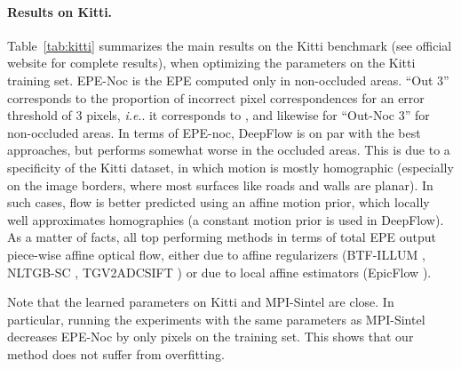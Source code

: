 \documentclass[twocolumn,natbib]{svjour3}
\makeatletter
\DeclareRobustCommand\onedot{\futurelet\@let@token\@onedot}
\def\@onedot{\ifx\@let@token.\else.\null\fi\xspace}
\def\ie{\emph{i.e}\onedot} \def\Ie{\emph{I.e}\onedot}
\makeatother
\begin{document}
\paragraph{Results on Kitti.}

Table~\ref{tab:kitti} summarizes the main results on the Kitti benchmark
(see official website for complete results), when optimizing the parameters
on the Kitti training set. EPE-Noc is the EPE computed only in
non-occluded areas. 
``Out 3'' corresponds to the proportion of incorrect pixel correspondences for an error
threshold of 3 pixels, \ie it corresponds to , and likewise for ``Out-Noc 3'' 
for non-occluded areas. 
In terms of EPE-noc, DeepFlow is on par with the best approaches, 
but performs somewhat worse in the occluded areas. This is 
due to a specificity of the Kitti dataset, in which motion is mostly homographic 
(especially on the image borders, where most surfaces like roads and walls are planar). 
In such cases, flow is better predicted using an affine motion prior, 
which locally well approximates homographies (a constant motion prior is used in DeepFlow).
As a matter of facts, all top performing methods in terms of total EPE output
piece-wise affine optical flow, either due to affine regularizers 
(BTF-ILLUM \citep{demetz2014learning}, NLTGB-SC \citep{ranftl2014non}, TGV2ADCSIFT \citep{Braux-Zin_2013_ICCV})
or due to local affine estimators (EpicFlow \citep{epicflow}).


Note that the learned parameters
on Kitti and MPI-Sintel are close. In particular, running the experiments
with the same parameters as MPI-Sintel decreases EPE-Noc by only 
pixels on the training set. This shows that our method does
not suffer from overfitting.
\end{document}
